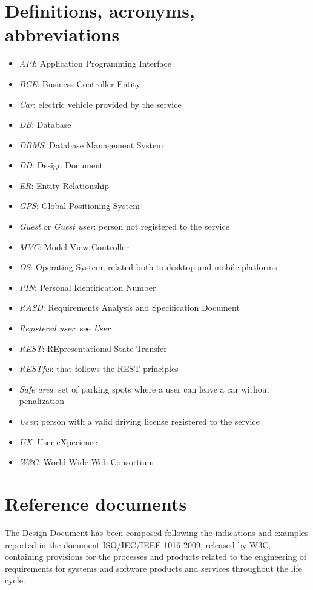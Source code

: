\section{Definitions, acronyms, abbreviations}
\begin{itemize}
	\item \emph{API}: Application Programming Interface
	\item \emph{BCE}: Business Controller Entity
	\item \emph{Car}: electric vehicle provided by the service
	\item \emph{DB}: Database
	\item \emph{DBMS}: Database Management System
	\item \emph{DD}: Design Document
	\item \emph{ER}: Entity-Relationship
	\item \emph{GPS}: Global Positioning System
	\item \emph{Guest} or \emph{Guest user}: person not registered to the service
	\item \emph{MVC}: Model View Controller
	\item \emph{OS}: Operating System, related both to desktop and mobile platforms
	\item \emph{PIN}: Personal Identification Number
	\item \emph{RASD}: Requirements Analysis and Specification Document
	\item \emph{Registered user}: see \emph{User}
	\item \emph{REST}: REpresentational State Transfer
	\item \emph{RESTful}: that follows the REST principles
	\item \emph{Safe area}: set of parking spots where a user can leave a car without penalization 
	\item \emph{User}: person with a valid driving license registered to the service
	\item \emph{UX}: User eXperience
	\item \emph{W3C}: World Wide Web Consortium
\end{itemize}

\section{Reference documents}
The Design Document has been composed following the indications and examples reported in the document ISO/IEC/IEEE 1016-2009, released by W3C, containing provisions for the processes and products related to the engineering of requirements for systems and software products and services throughout the life cycle.

